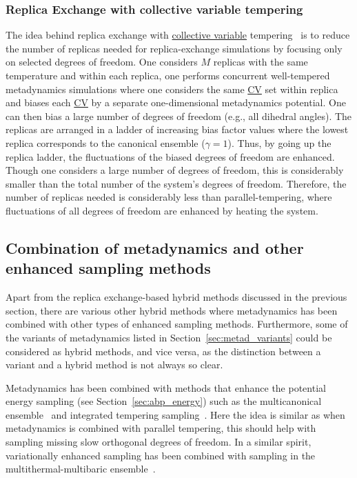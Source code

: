 \documentclass[9pt,review]{livecoms}
\begin{document}
\subsubsection{Replica Exchange with collective variable tempering}

The idea behind replica exchange with \hyperlink{ref:CV} {collective variable} tempering~\cite{Gil-Ley_JCTC-2015} is to reduce the number of replicas needed for replica-exchange simulations by focusing only on selected degrees of freedom. One considers $M$ replicas with the same temperature and within each replica, one performs concurrent well-tempered metadynamics simulations where one considers the same \hyperlink{ref:CV} {CV} set within replica and biases each \hyperlink{ref:CV} {CV} by a separate one-dimensional metadynamics potential. One can then bias a large number of degrees of freedom (e.g., all dihedral angles). The replicas are arranged in a ladder of increasing bias factor values where the lowest replica corresponds to the canonical ensemble ($\gamma=1$). Thus, by going up the replica ladder, the fluctuations of the biased degrees of freedom are enhanced. Though one considers a large number of degrees of freedom, this is considerably smaller than the total number of the system's degrees of freedom. Therefore, the number of replicas needed is considerably less than parallel-tempering, where fluctuations of all degrees of freedom are enhanced by heating the system.

\subsection{Combination of metadynamics and other enhanced sampling methods}

Apart from the replica exchange-based hybrid methods discussed in the previous section, there are various other hybrid methods where metadynamics has been combined with other types of enhanced sampling methods. Furthermore, some of the variants of metadynamics listed in Section~\ref{sec:metad_variants} could be considered as hybrid methods, and vice versa, as the distinction between a variant and a hybrid method is not always so clear.

Metadynamics has been combined with methods that enhance the potential energy sampling (see Section~\ref{sec:abp_energy}) such as the multicanonical ensemble~\cite{Yonezawa_MulticanonicalMetaD_2011} and integrated tempering sampling~\cite{Yang_MetaD-ITS_1_2016,Yang_MetaD-ITS_2_2018}. Here the idea is similar as when metadynamics is combined with parallel tempering, this should help with sampling missing slow orthogonal degrees of freedom. In a similar spirit, variationally enhanced sampling has been combined with sampling in the multithermal-multibaric ensemble~\cite{Piaggi_MultiVES_2019,Piaggi_MultiVES+CV_2019}.
\end{document}
